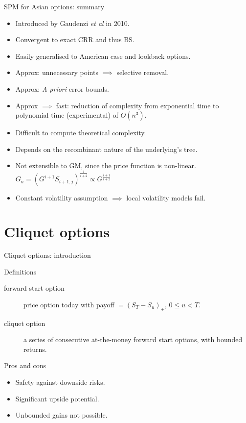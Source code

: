 \documentclass[utf8,t,xcolor=svgnames]{beamer}
\newcommand\pro{\item[\textbf{\CheckedBox}]}
\newcommand\con{\item[\textbf{\XBox}]}
\newcommand\neu{\item[\textbf{\Square}]}
\begin{document}
\begin{frame}{SPM for Asian options: summary}
	\begin{itemize}
		\neu Introduced by Gaudenzi \emph{et al} \cite{Gaudenzi2010} in 2010.
		\pro Convergent to exact CRR and thus BS.
		\pro Easily generalised to American case and lookback options.
		\pro Approx: unnecessary points $ \implies $ selective removal.
		\pro Approx: \emph{A priori} error bounds.
		\pro Approx $ \implies $ fast: reduction of complexity from exponential time to polynomial time (experimental) of $ O(n^3) $.
		\con Difficult to compute theoretical complexity.
		\con Depends on the recombinant nature of the underlying's tree.
		\con<alert@1-> Not extensible to GM, since the price function is non-linear. $ G_u = \left( G^{i+1} S_{i+1,j} \right)^{\frac{1}{i+2}} \propto G^{\frac{i+1}{i+2}} $
		\con<alert@1-> Constant volatility assumption $ \implies $ local volatility models fail.
	\end{itemize}
\end{frame}



\section{Cliquet options}

\begin{frame}{Cliquet options: introduction}
	\begin{block}{Definitions}
		\begin{description}
			\item[forward start option] price option today with payoff $ = (S_T - S_u)_+ $, $ 0 \le u < T $.
			\item[cliquet option] a series of consecutive at-the-money forward start options, with bounded returns.
		\end{description}
	\end{block}
	\begin{block}{Pros and cons}
		\begin{itemize}
			\pro Safety against downside risks.
			\pro Significant upside potential.
			\con Unbounded gains not possible.
		\end{itemize}
	\end{block}
\end{frame}
\end{document}
